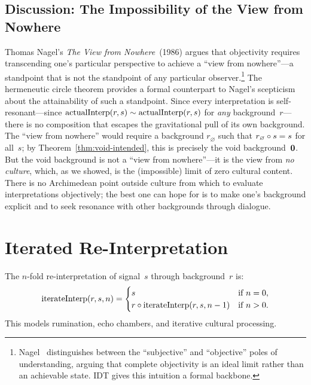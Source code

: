 \subsection*{Discussion: The Impossibility of the View from Nowhere}

Thomas Nagel's \textit{The View from Nowhere}~(1986) argues that
objectivity requires transcending one's particular perspective to
achieve a ``view from nowhere''---a standpoint that is not the standpoint
of any particular observer.\footnote{Nagel~\cite{nagel1986}
distinguishes between the ``subjective'' and ``objective'' poles of
understanding, arguing that complete objectivity is an ideal limit rather
than an achievable state.  IDT gives this intuition a formal backbone.}
The hermeneutic circle theorem provides a formal counterpart to Nagel's
scepticism about the attainability of such a standpoint.  Since every
interpretation is self-resonant---since
$\operatorname{actualInterp}(r, s) \sim \operatorname{actualInterp}(r, s)$
for \emph{any} background~$r$---there is no composition that escapes the
gravitational pull of its own background.  The ``view from nowhere''
would require a background $r_{\varnothing}$ such that
$r_{\varnothing} \circ s = s$ for all~$s$; by
Theorem~\ref{thm:void-intended}, this is precisely the void
background~$\mathbf{0}$.  But the void background is not a ``view from
nowhere''---it is the view from \emph{no culture}, which, as we showed,
is the (impossible) limit of zero cultural content.  There is no
Archimedean point outside culture from which to evaluate interpretations
objectively; the best one can hope for is to make one's background
explicit and to seek resonance with other backgrounds through dialogue.

\section{Iterated Re-Interpretation}
\label{sec:ch5:iteration}

\begin{definition}
\label{def:iterate-interp}
The $n$-fold re-interpretation of signal~$s$ through background~$r$ is:
\[
  \operatorname{iterateInterp}(r, s, n) =
  \begin{cases}
    s & \text{if } n = 0, \\
    r \circ \operatorname{iterateInterp}(r, s, n-1) & \text{if } n > 0.
  \end{cases}
\]
This models rumination, echo chambers, and iterative cultural processing.
\end{definition}

